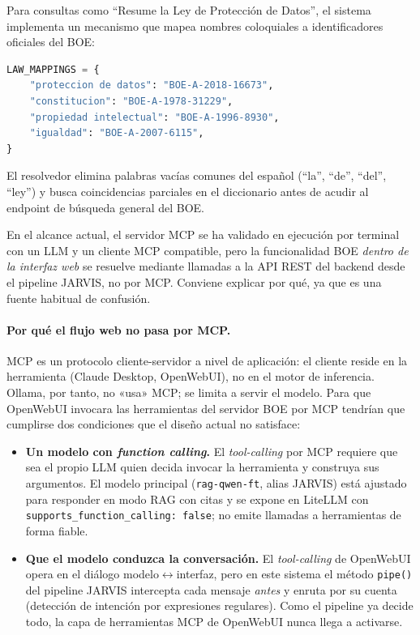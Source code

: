 Para consultas como ``Resume la Ley de Protección de Datos'', el sistema implementa un mecanismo que mapea nombres coloquiales a identificadores oficiales del BOE:

\begin{lstlisting}[language=Python, caption={Mapeo semántico de nombres de leyes.}]
LAW_MAPPINGS = {
    "proteccion de datos": "BOE-A-2018-16673",
    "constitucion": "BOE-A-1978-31229",
    "propiedad intelectual": "BOE-A-1996-8930",
    "igualdad": "BOE-A-2007-6115",
}
\end{lstlisting}

El resolvedor elimina palabras vacías comunes del español (``la'', ``de'', ``del'', ``ley'') y busca coincidencias parciales en el diccionario antes de acudir al endpoint de búsqueda general del BOE.

En el alcance actual, el servidor MCP se ha validado en ejecución por terminal con un LLM y un cliente MCP compatible, pero la funcionalidad BOE \emph{dentro de la interfaz web} se resuelve mediante llamadas a la API REST del backend desde el pipeline JARVIS, no por MCP. Conviene explicar por qué, ya que es una fuente habitual de confusión.

\paragraph{Por qué el flujo web no pasa por MCP.} MCP es un protocolo cliente-servidor a nivel de aplicación: el cliente reside en la herramienta (Claude Desktop, OpenWebUI), no en el motor de inferencia. Ollama, por tanto, no «usa» MCP; se limita a servir el modelo. Para que OpenWebUI invocara las herramientas del servidor BOE por MCP tendrían que cumplirse dos condiciones que el diseño actual no satisface:

\begin{itemize}
    \item \textbf{Un modelo con \textit{function calling}.} El \textit{tool-calling} por MCP requiere que sea el propio LLM quien decida invocar la herramienta y construya sus argumentos. El modelo principal (\texttt{rag-qwen-ft}, alias JARVIS) está ajustado para responder en modo RAG con citas y se expone en LiteLLM con \texttt{supports\_function\_calling: false}; no emite llamadas a herramientas de forma fiable.
    \item \textbf{Que el modelo conduzca la conversación.} El \textit{tool-calling} de OpenWebUI opera en el diálogo modelo$\leftrightarrow$interfaz, pero en este sistema el método \texttt{pipe()} del pipeline JARVIS intercepta cada mensaje \emph{antes} y enruta por su cuenta (detección de intención por expresiones regulares). Como el pipeline ya decide todo, la capa de herramientas MCP de OpenWebUI nunca llega a activarse.
\end{itemize}

